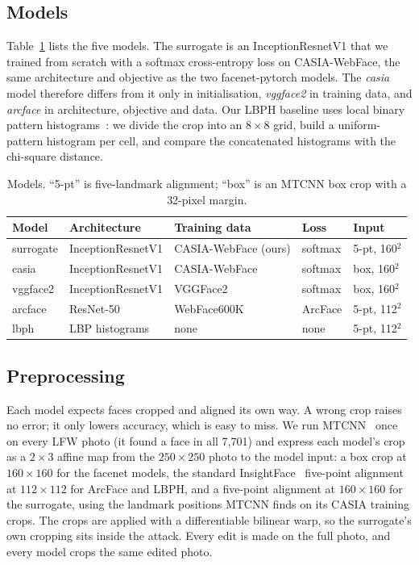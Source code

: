 \documentclass[conference]{IEEEtran}
\begin{document}
\subsection{Models}
Table~\ref{tab:models} lists the five models. The surrogate is an InceptionResnetV1 that we trained from scratch
with a softmax cross-entropy loss on CASIA-WebFace, the same architecture and objective as the two facenet-pytorch
models. The \emph{casia} model therefore differs from it only in initialisation, \emph{vggface2} in training data,
and \emph{arcface} in architecture, objective and data. Our LBPH baseline uses local binary pattern
histograms~\cite{lbph}: we divide the crop into an $8\times8$ grid, build a uniform-pattern histogram per cell,
and compare the concatenated histograms with the chi-square distance.

\begin{table}[tb]
\centering
\caption{Models. ``5-pt'' is five-landmark alignment; ``box'' is an MTCNN box crop with a 32-pixel margin.}
\label{tab:models}
\scriptsize
\setlength{\tabcolsep}{3pt}
\begin{tabular}{lllll}
\toprule
Model & Architecture & Training data & Loss & Input \\
\midrule
surrogate & InceptionResnetV1 & CASIA-WebFace (ours) & softmax & 5-pt, 160$^2$ \\
casia & InceptionResnetV1 & CASIA-WebFace & softmax & box, 160$^2$ \\
vggface2 & InceptionResnetV1 & VGGFace2 & softmax & box, 160$^2$ \\
arcface & ResNet-50 & WebFace600K & ArcFace & 5-pt, 112$^2$ \\
lbph & LBP histograms & none & none & 5-pt, 112$^2$ \\
\bottomrule
\end{tabular}
\end{table}

\subsection{Preprocessing}
Each model expects faces cropped and aligned its own way. A wrong crop raises no error; it only lowers accuracy,
which is easy to miss. We run MTCNN~\cite{mtcnn} once on every LFW photo (it found a face in all 7,701) and express each model's crop
as a $2\times3$ affine map from the $250\times250$ photo to the model input: a box crop at $160\times160$ for the
facenet models, the standard InsightFace~\cite{insightface} five-point alignment at $112\times112$ for ArcFace and LBPH, and a
five-point alignment at $160\times160$ for the surrogate, using the landmark positions MTCNN finds on its CASIA
training crops. The crops are applied with a differentiable bilinear warp, so the surrogate's own cropping sits
inside the attack. Every edit is made on the full photo, and every model crops the same edited photo.
\end{document}
